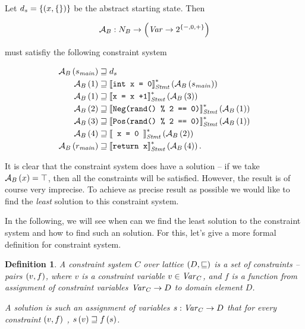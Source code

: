 \documentclass[..thesis.tex]{subfiles}
\newtheorem{defin}{Definition}[section]
\begin{document}
Let $d_s = \left\lbrace \left( x, \left\lbrace \right\rbrace \right) \right\rbrace $ be the abstract starting state.
Then 

\begin{equation*}
\mathcal{A}_B : N_B \to \left( \mathit{Var} \to 2^{ \left\lbrace -, 0, + \right\rbrace } \right)
\end{equation*}

 must satisfiy the following constraint system

\begin{equation*}
  \begin{split}
    \mathcal{A}_B \left( s_{\mathit{main}} \right) & \sqsupseteq d_s \\
    \mathcal{A}_B \left( 1 \right) & \sqsupseteq \left\llbracket \text{\texttt{int x = 0}} \right\rrbracket_{\mathit{Stmt}}^{*} \left( \mathcal{A}_B \left( s_{\mathit{main}} \right) \right) \\
    \mathcal{A}_B \left( 1 \right) & \sqsupseteq \left\llbracket \text{\texttt{x = x +1}}  \right\rrbracket_{\mathit{Stmt}}^{*} \left( \mathcal{A}_B \left( 3 \right) \right) \\
    \mathcal{A}_B \left( 2 \right) & \sqsupseteq \left\llbracket  \text{\texttt{Neg(rand() \% 2 == 0)}}  \right\rrbracket_{\mathit{Stmt}}^{*} \left( \mathcal{A}_B \left( 1 \right) \right) \\
    \mathcal{A}_B \left( 3 \right) & \sqsupseteq \left\llbracket  \text{\texttt{Pos(rand() \% 2 == 0)}}  \right\rrbracket_{\mathit{Stmt}}^{*} \left( \mathcal{A}_B \left( 1 \right) \right) \\
    \mathcal{A}_B \left( 4 \right) & \sqsupseteq \left\llbracket \text{\texttt{ x = 0 }} \right\rrbracket_{\mathit{Stmt}}^{*} \left( \mathcal{A}_B \left( 2 \right) \right) \\
    \mathcal{A}_B \left( r_{\mathit{main}} \right)  & \sqsupseteq \left\llbracket  \text{\texttt{return x}}  \right\rrbracket_{\mathit{Stmt}}^{*} \left( \mathcal{A}_B \left( 4 \right) \right) \text{.}
  \end{split} 
\end{equation*}


It is clear that the constraint system does have a solution -- if we take $\mathcal{A}_B \left( x \right) = \top$, then all the constraints will be satisfied.
However, the result is of course very imprecise. To achieve as precise result as possible we  would like to find the \textit{least} solution to this constraint system. 

In the following, we will see when can we find the least solution to the constraint system and how to find such an solution. For this, let's give a more formal definition for constraint system.

\begin{defin}
A \textit{constraint system} $C$ over lattice $\left( D, \sqsubseteq \right)$ is a set of \textit{constraints} -- pairs $\left( v, f \right)$,
where $v$ is a constraint variable $v \in \mathit{Var}_C$, and $f$ is a function from assignment of constraint variables $\mathit{Var}_C \to D$ to domain element $D$.

A \textit{solution} is such an assignment of variables $s : \mathit{Var}_C -> D$ that for every constraint $\left( v, f \right)$ , $ s \left( v \right) \sqsupseteq f \left( s \right)$. 
\end{defin}
\end{document}
